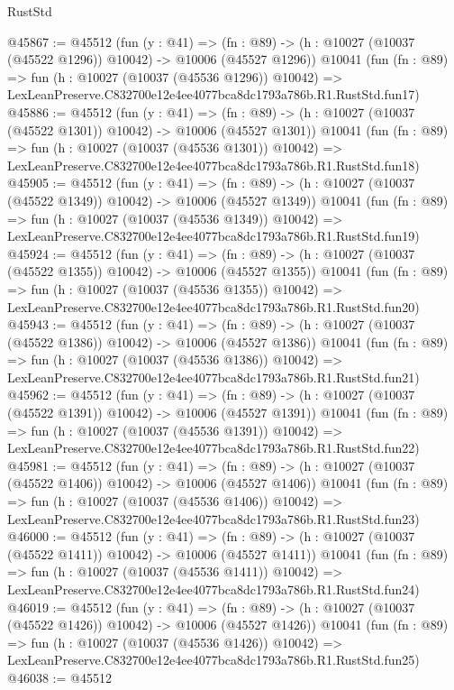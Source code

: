 \begin{lexlean}{RustStd}
\begin{coremodule}
@45867 := @45512
    (fun (y : @41) =>
    (fn : @89) -> (h : @10027 (@10037 (@45522 @1296)) @10042) -> @10006 (@45527 @1296))
    @10041
    (fun (fn : @89) =>
    fun (h : @10027 (@10037 (@45536 @1296)) @10042) =>
    LexLeanPreserve.C832700e12e4ee4077bca8dc1793a786b.R1.RustStd.fun17)
@45886 := @45512
    (fun (y : @41) =>
    (fn : @89) -> (h : @10027 (@10037 (@45522 @1301)) @10042) -> @10006 (@45527 @1301))
    @10041
    (fun (fn : @89) =>
    fun (h : @10027 (@10037 (@45536 @1301)) @10042) =>
    LexLeanPreserve.C832700e12e4ee4077bca8dc1793a786b.R1.RustStd.fun18)
@45905 := @45512
    (fun (y : @41) =>
    (fn : @89) -> (h : @10027 (@10037 (@45522 @1349)) @10042) -> @10006 (@45527 @1349))
    @10041
    (fun (fn : @89) =>
    fun (h : @10027 (@10037 (@45536 @1349)) @10042) =>
    LexLeanPreserve.C832700e12e4ee4077bca8dc1793a786b.R1.RustStd.fun19)
@45924 := @45512
    (fun (y : @41) =>
    (fn : @89) -> (h : @10027 (@10037 (@45522 @1355)) @10042) -> @10006 (@45527 @1355))
    @10041
    (fun (fn : @89) =>
    fun (h : @10027 (@10037 (@45536 @1355)) @10042) =>
    LexLeanPreserve.C832700e12e4ee4077bca8dc1793a786b.R1.RustStd.fun20)
@45943 := @45512
    (fun (y : @41) =>
    (fn : @89) -> (h : @10027 (@10037 (@45522 @1386)) @10042) -> @10006 (@45527 @1386))
    @10041
    (fun (fn : @89) =>
    fun (h : @10027 (@10037 (@45536 @1386)) @10042) =>
    LexLeanPreserve.C832700e12e4ee4077bca8dc1793a786b.R1.RustStd.fun21)
@45962 := @45512
    (fun (y : @41) =>
    (fn : @89) -> (h : @10027 (@10037 (@45522 @1391)) @10042) -> @10006 (@45527 @1391))
    @10041
    (fun (fn : @89) =>
    fun (h : @10027 (@10037 (@45536 @1391)) @10042) =>
    LexLeanPreserve.C832700e12e4ee4077bca8dc1793a786b.R1.RustStd.fun22)
@45981 := @45512
    (fun (y : @41) =>
    (fn : @89) -> (h : @10027 (@10037 (@45522 @1406)) @10042) -> @10006 (@45527 @1406))
    @10041
    (fun (fn : @89) =>
    fun (h : @10027 (@10037 (@45536 @1406)) @10042) =>
    LexLeanPreserve.C832700e12e4ee4077bca8dc1793a786b.R1.RustStd.fun23)
@46000 := @45512
    (fun (y : @41) =>
    (fn : @89) -> (h : @10027 (@10037 (@45522 @1411)) @10042) -> @10006 (@45527 @1411))
    @10041
    (fun (fn : @89) =>
    fun (h : @10027 (@10037 (@45536 @1411)) @10042) =>
    LexLeanPreserve.C832700e12e4ee4077bca8dc1793a786b.R1.RustStd.fun24)
@46019 := @45512
    (fun (y : @41) =>
    (fn : @89) -> (h : @10027 (@10037 (@45522 @1426)) @10042) -> @10006 (@45527 @1426))
    @10041
    (fun (fn : @89) =>
    fun (h : @10027 (@10037 (@45536 @1426)) @10042) =>
    LexLeanPreserve.C832700e12e4ee4077bca8dc1793a786b.R1.RustStd.fun25)
@46038 := @45512

\end{coremodule}
\end{lexlean}
